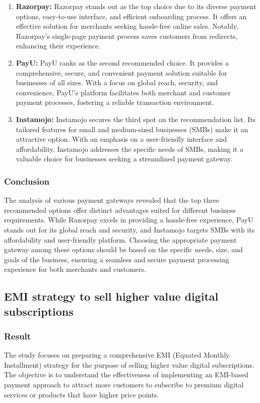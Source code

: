 \begin{enumerate}
    \item \textbf{Razorpay:} Razorpay stands out as the top choice due to its diverse payment options, easy-to-use interface, and efficient onboarding process. It offers an effective solution for merchants seeking hassle-free online sales. Notably, Razorpay's single-page payment process saves customers from redirects, enhancing their experience.
    
    \item \textbf{PayU:} PayU ranks as the second recommended choice. It provides a comprehensive, secure, and convenient payment solution suitable for businesses of all sizes. With a focus on global reach, security, and convenience, PayU's platform facilitates both merchant and customer payment processes, fostering a reliable transaction environment.
    
    \item \textbf{Instamojo:} Instamojo secures the third spot on the recommendation list. Its tailored features for small and medium-sized businesses (SMBs) make it an attractive option. With an emphasis on a user-friendly interface and affordability, Instamojo addresses the specific needs of SMBs, making it a valuable choice for businesses seeking a streamlined payment gateway.
\end{enumerate}
\subsubsection{Conclusion}
The analysis of various payment gateways revealed that the top three recommended options offer distinct advantages suited for different business requirements. While Razorpay excels in providing a hassle-free experience, PayU stands out for its global reach and security, and Instamojo targets SMBs with its affordability and user-friendly platform. Choosing the appropriate payment gateway among these options should be based on the specific needs, size, and goals of the business, ensuring a seamless and secure payment processing experience for both merchants and customers.

\subsection{EMI strategy to sell higher value digital subscriptions}
\subsubsection{Result}
The study focuses on preparing a comprehensive EMI (Equated Monthly Installment) strategy for the purpose of selling higher value digital subscriptions. The objective is to understand the effectiveness of implementing an EMI-based payment approach to attract more customers to subscribe to premium digital services or products that have higher price points.

